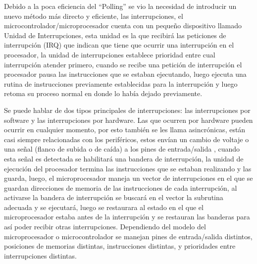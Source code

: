 \documentclass[11pt]{article}
\begin{document}
Debido a la poca eficiencia del “Polling” se vio la necesidad de introducir un nuevo método más directo y eficiente, las interrupciones, el microcontrolador/microprocesador cuenta con un pequeño dispositivo llamado Unidad de Interrupciones, esta unidad es la que recibirá las peticiones de interrupción (IRQ) que indican que tiene que ocurrir una interrupción en el procesador, la unidad de interrupciones establece prioridad entre cual interrupción atender primero, cuando se recibe una petición de interrupción el procesador pausa las instrucciones que se estaban ejecutando, luego ejecuta una rutina de instrucciones previamente establecidas para la interrupción y luego retoma su proceso normal en donde lo había dejado previamente.


 Se puede hablar de dos tipos principales de interrupciones: las interrupciones por software y las interrupciones por hardware. Las que ocurren por hardware pueden ocurrir en cualquier momento, por esto también se les llama asincrónicas, están casi siempre relacionadas con  los periféricos, estos envían un cambio de voltaje o una señal (flanco de subida o de caída) a los pines de entrada/salida , cuando esta señal es detectada se habilitará una bandera de interrupción, la unidad de ejecución del procesador termina las instrucciones que se estaban realizando y las guarda, luego, el microprocesador maneja un vector de interrupciones en el que se  guardan direcciones de memoria de las instrucciones de cada interrupción, al activarse la bandera de interrupción se buscará en el vector  la subrutina adecuada y se ejecutará, luego se restaurara al estado en el que el microprocesador estaba antes de la interrupción y se restauran las banderas para así poder recibir otras interrupciones. Dependiendo del modelo del microprocesador o microcontrolador se manejan pines de entrada/salida distintos, posiciones de memorias distintas, instrucciones distintas, y prioridades entre interrupciones distintas.

\medskip
 
\end{document}
